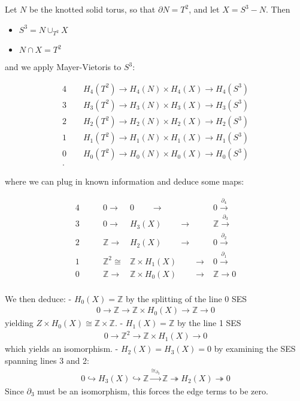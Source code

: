 Let \(N\) be the knotted solid torus, so that \({\partial}N = T^2\), and
let \(X = S^3 - N\). Then

\begin{itemize}
\tightlist
\item
  \(S^3 = N \cup_{T^2} X\)
\item
  \(N \cap X = T^2\)
\end{itemize}

and we apply Mayer-Vietoris to \(S^3\):

\begin{align*} 4\qquad H_4(T^2) \to H_4(N) \times H_4(X) \to H_4(S^3) \\ 3\qquad H_3(T^2) \to H_3(N) \times H_3(X) \to H_3(S^3) \\ 2\qquad H_2(T^2) \to H_2(N) \times H_2(X) \to H_2(S^3) \\ 1\qquad H_1(T^2) \to H_1(N) \times H_1(X) \to H_1(S^3) \\ 0\qquad H_0(T^2) \to H_0(N) \times H_0(X) \to H_0(S^3) \\ .\end{align*}

where we can plug in known information and deduce some maps:

\begin{align} 4\qquad &0 \to &0 \qquad\to &0 \xrightarrow{{\partial}_4} \\ 3\qquad &0 \to &H_3(X) \qquad\to &{\mathbb{Z}}\xrightarrow{{\partial}_3}\\ 2\qquad &{\mathbb{Z}}\to &H_2(X) \qquad\to &0 \xrightarrow{{\partial}_2}\\ 1\qquad &{\mathbb{Z}}^2 \cong &{\mathbb{Z}}\times H_1(X) \qquad\to &0 \xrightarrow{{\partial}_1}\\ 0\qquad &{\mathbb{Z}}\to &{\mathbb{Z}}\times H_0(X) \qquad\to &{\mathbb{Z}}\to 0 \\ \end{align}

We then deduce: - \(H_0(X) = {\mathbb{Z}}\) by the splitting of the line
0 SES
\begin{align*}
  0 \to {\mathbb{Z}}\to {\mathbb{Z}}\times H_0(X) \to {\mathbb{Z}}\to 0
  \end{align*}
yielding \(Z\times H_0(X) \cong {\mathbb{Z}}\times {\mathbb{Z}}\). -
\(H_1(X) = {\mathbb{Z}}\) by the line 1 SES
\begin{align*}
  0 \to {\mathbb{Z}}^2 \to {\mathbb{Z}}\times H_1(X) \to 0
  \end{align*}
which yields an isomorphism. - \(H_2(X) = H_3(X) = 0\) by examining the
SES spanning lines 3 and 2:
\begin{align*}
  0 \hookrightarrow H_3(X) \hookrightarrow{\mathbb{Z}}\xrightarrow{\cong_{{\partial}_3}} {\mathbb{Z}}\twoheadrightarrow H_2(X) \twoheadrightarrow 0
  \end{align*}
Since \({\partial}_3\) must be an isomorphism, this forces the edge
terms to be zero.

